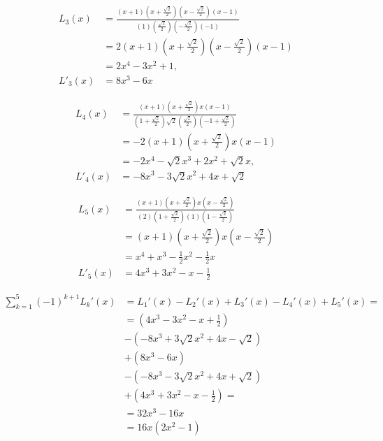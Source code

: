 \documentclass[12pt,a4paper]{article}
\begin{document}
	\begin{align*}
		L_3(x)
		&=
		\frac{
			(x+1)
			\left(x+\frac{\sqrt{2}}{2}\right)
			\left(x-\frac{\sqrt{2}}{2}\right)
			(x-1)
		}{
			(1)
			\left(\frac{\sqrt{2}}{2}\right)
			\left(-\frac{\sqrt{2}}{2}\right)
			(-1)
		}
		\\
		&=
		2(x+1)
		\left(x+\frac{\sqrt{2}}{2}\right)
		\left(x-\frac{\sqrt{2}}{2}\right)
		(x-1)
		\\
		&=
		2x^4-3x^2+1,
		\\[4mm]
		L'_3(x) &= 8x^3 - 6x
	\end{align*}
	
	\begin{align*}
		L_4(x)
		&=
		\frac{
			(x+1)
			\left(x+\frac{\sqrt{2}}{2}\right)
			x
			(x-1)
		}{
			\left(1+\frac{\sqrt{2}}{2}\right)
			\sqrt{2}
			\left(\frac{\sqrt{2}}{2}\right)
			\left(-1+\frac{\sqrt{2}}{2}\right)
		}
		\\
		&=
		-2(x+1)
		\left(x+\frac{\sqrt{2}}{2}\right)
		x
		(x-1)
		\\
		&=
		-2x^4-\sqrt{2}x^3+2x^2+\sqrt{2}x,
		\\[4mm]
		L'_4(x) &= -8x^3 - 3\sqrt{2}x^2 + 4x + \sqrt{2}
	\end{align*}
		
	\begin{align*}
		L_5(x)
		&=
		\frac{
			(x+1)
			\left(x+\frac{\sqrt{2}}{2}\right)
			x
			\left(x-\frac{\sqrt{2}}{2}\right)
		}{
			(2)
			\left(1+\frac{\sqrt{2}}{2}\right)
			(1)
			\left(1-\frac{\sqrt{2}}{2}\right)
		}
		\\
		&=
		(x+1)
		\left(x+\frac{\sqrt{2}}{2}\right)
		x
		\left(x-\frac{\sqrt{2}}{2}\right)
		\\
		&=
		x^4+x^3-\frac{1}{2}x^2-\frac{1}{2}x\\[4mm]
		L'_5(x) &= 4x^3 + 3x^2 -x - \frac{1}{2}
	\end{align*}
	
	
	
	\begin{align*}
		\sum_{k=1}^{5}(-1)^{k+1}L_k'(x)
		&=
		L_1'(x)-L_2'(x)+L_3'(x)-L_4'(x)+L_5'(x) = \\
		&=
		(4x^3 -3x^2-x+\frac{1}{2})\\
		&
		- (-8x^3 + 3\sqrt{2}x^2 + 4x - \sqrt{2})\\
		&
		+ (8x^3 - 6x)\\
		&
		-(-8x^3 - 3\sqrt{2}x^2 + 4x + \sqrt{2})\\
		&
		+(4x^3 + 3x^2 -x - \frac{1}{2}) =\\
		& =
		32x^3-16x \\
		& =
		16x(2x^2-1)
	\end{align*}
	
\end{document}
